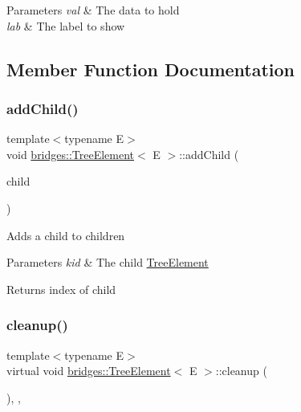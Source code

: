 \begin{DoxyParams}{Parameters}
{\em val} & The data to hold \\
\hline
{\em lab} & The label to show \\
\hline
\end{DoxyParams}


\subsection{Member Function Documentation}
\hypertarget{classbridges_1_1_tree_element_a5e252fa16df0e673526ba4b08c8d3203}{}\label{classbridges_1_1_tree_element_a5e252fa16df0e673526ba4b08c8d3203} 
\subsubsection{\texorpdfstring{add\+Child()}{addChild()}}
{\footnotesize\ttfamily template$<$typename E$>$ \\
void \hyperlink{classbridges_1_1_tree_element}{bridges\+::\+Tree\+Element}$<$ E $>$\+::add\+Child (\begin{DoxyParamCaption}\item[{\hyperlink{classbridges_1_1_tree_element}{Tree\+Element}$<$ E $>$ $\ast$}]{child }\end{DoxyParamCaption})\hspace{0.3cm}{\ttfamily [inline]}}

Adds a child to children


\begin{DoxyParams}{Parameters}
{\em kid} & The child \hyperlink{classbridges_1_1_tree_element}{Tree\+Element} \\
\hline
\end{DoxyParams}
\begin{DoxyReturn}{Returns}
index of child 
\end{DoxyReturn}
\hypertarget{classbridges_1_1_tree_element_aad832c9f8dfd7e92c7b06a825f406e1d}{}\label{classbridges_1_1_tree_element_aad832c9f8dfd7e92c7b06a825f406e1d} 
\subsubsection{\texorpdfstring{cleanup()}{cleanup()}}
{\footnotesize\ttfamily template$<$typename E$>$ \\
virtual void \hyperlink{classbridges_1_1_tree_element}{bridges\+::\+Tree\+Element}$<$ E $>$\+::cleanup (\begin{DoxyParamCaption}{ }\end{DoxyParamCaption})\hspace{0.3cm}{\ttfamily [inline]}, {\ttfamily [override]}, {\ttfamily [virtual]}}

